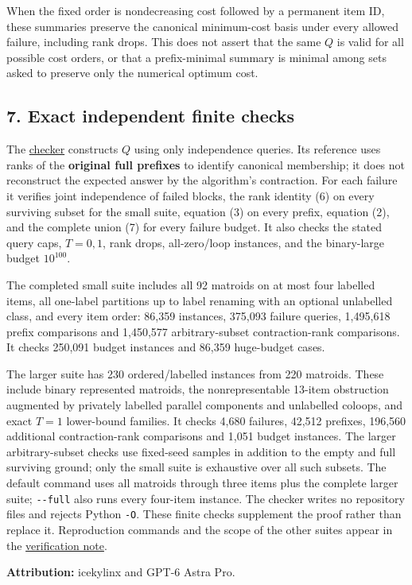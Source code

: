 When the fixed order is nondecreasing cost followed by a permanent item ID, these summaries preserve the canonical minimum-cost basis under every allowed failure, including rank drops. This does not assert that the same \(Q\) is valid for all possible cost orders, or that a prefix-minimal summary is minimal among sets asked to preserve only the numerical optimum cost.

\hypertarget{af-b2bf8a6e14-exact-independent-finite-checks}{%
\subsection{7. Exact independent finite checks}\label{af-b2bf8a6e14-exact-independent-finite-checks}}

The \href{https://github.com/icekylinx/algorithm-frontier/blob/main/problems/matroid-failure-summaries/verify/check_rank_loss_contraction.py}{checker} constructs \(Q\) using only independence queries. Its reference uses ranks of the \textbf{original full prefixes} to identify canonical membership; it does not reconstruct the expected answer by the algorithm's contraction. For each failure it verifies joint independence of failed blocks, the rank identity (6) on every surviving subset for the small suite, equation (3) on every prefix, equation (2), and the complete union (7) for every failure budget. It also checks the stated query caps, \(T=0,1\), rank drops, all-zero/loop instances, and the binary-large budget \(10^{100}\).

The completed small suite includes all 92 matroids on at most four labelled items, all one-label partitions up to label renaming with an optional unlabelled class, and every item order: 86,359 instances, 375,093 failure queries, 1,495,618 prefix comparisons and 1,450,577 arbitrary-subset contraction-rank comparisons. It checks 250,091 budget instances and 86,359 huge-budget cases.

The larger suite has 230 ordered/labelled instances from 220 matroids. These include binary represented matroids, the nonrepresentable 13-item obstruction augmented by privately labelled parallel components and unlabelled coloops, and exact \(T=1\) lower-bound families. It checks 4,680 failures, 42,512 prefixes, 196,560 additional contraction-rank comparisons and 1,051 budget instances. The larger arbitrary-subset checks use fixed-seed samples in addition to the empty and full surviving ground; only the small suite is exhaustive over all such subsets. The default command uses all matroids through three items plus the complete larger suite; \texttt{-\/-full} also runs every four-item instance. The checker writes no repository files and rejects Python \texttt{-O}. These finite checks supplement the proof rather than replace it. Reproduction commands and the scope of the other suites appear in the \href{https://github.com/icekylinx/algorithm-frontier/blob/main/problems/matroid-failure-summaries/verify/README.md}{verification note}.

\textbf{Attribution:} icekylinx and GPT-6 Astra Pro.
